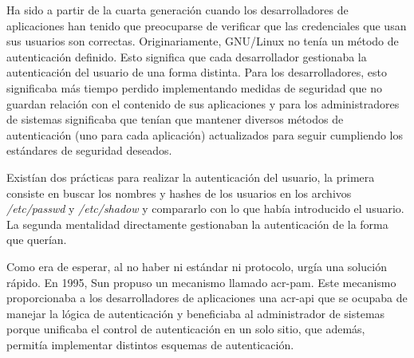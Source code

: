 \documentclass[twoside, titlepage, 12pt, a4paper]{article}
\begin{document}
Ha sido a partir de la cuarta generación cuando los desarrolladores de aplicaciones han tenido que preocuparse de verificar que las credenciales que usan sus usuarios son correctas. Originariamente, \gls{GNU/Linux} no tenía un método de autenticación definido. Esto significa que cada desarrollador gestionaba la autenticación del usuario de una forma distinta. Para los desarrolladores, esto significaba más tiempo perdido implementando medidas de seguridad que no guardan relación con el contenido de sus aplicaciones y para los administradores de sistemas significaba que tenían que mantener diversos métodos de autenticación (uno para cada aplicación) actualizados para seguir cumpliendo los estándares de seguridad deseados. \par
Existían dos prácticas para realizar la autenticación del usuario, la primera consiste en buscar los nombres y hashes de los usuarios en los archivos \textit{/etc/passwd} y \textit{/etc/shadow} y compararlo con lo que había introducido el usuario. La segunda mentalidad directamente gestionaban la autenticación de la forma que querían. \par
Como era de esperar, al no haber ni estándar ni protocolo, urgía una solución rápido. En 1995, \gls{Sun} propuso un mecanismo llamado \gls{acr-pam}. Este mecanismo proporcionaba a los desarrolladores de aplicaciones una \gls{acr-api} que se ocupaba de manejar la lógica de autenticación y beneficiaba al administrador de sistemas porque unificaba el control de autenticación en un solo sitio, que además, permitía implementar distintos esquemas de autenticación.
\end{document}
